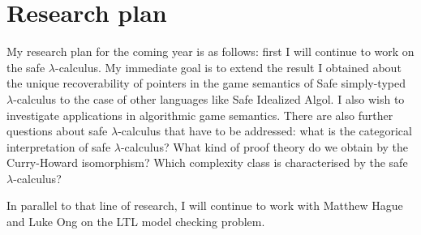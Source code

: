 \chapter{Research plan}

My research plan for the coming year is as follows: first I will
continue to work on the safe $\lambda$-calculus. My immediate goal
is to extend the result I obtained about the unique recoverability
of pointers in the game semantics of Safe simply-typed
$\lambda$-calculus to the case of other languages like Safe
Idealized Algol. I also wish to investigate applications in
algorithmic game semantics. There are also further questions about
safe $\lambda$-calculus that have to be addressed: what is the
categorical interpretation of safe $\lambda$-calculus? What kind of
proof theory do we obtain by the Curry-Howard isomorphism? Which
complexity class is characterised by the safe $\lambda$-calculus?

In parallel to that line of research, I will continue to work with
Matthew Hague and Luke Ong on the LTL model checking problem.


